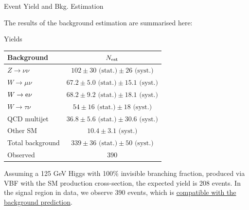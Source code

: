 \documentclass[8pt]{beamer}
\newcommand{\stat}{\text{ (stat.)}}
\newcommand{\syst}{\text{ (syst.)}}
\begin{document}
\begin{frame}{Event Yield and Bkg. Estimation}

The results of the background estimation are summarised here:

\begin{block}{Yields}

\begin{table}[th!]
\centering
\begin{tabular}{|l|c|}
\hline
Background 	 		& $N_{\rm est}$ \\
\hline
$Z \rightarrow \nu\nu$ 		& $102 \pm 30 \stat \pm 26 \syst$	\\
$W \rightarrow \mu\nu$ 	 	& $67.2 \pm 5.0 \stat \pm 15.1 \syst$ 	\\
$W \rightarrow {\rm e} \nu$  	& $68.2 \pm 9.2 \stat \pm 18.1 \syst$	\\
$W \rightarrow \tau \nu$ 	& $54 \pm 16 \stat \pm 18 \syst$ \\
QCD multijet 	 		& $36.8 \pm 5.6 \stat \pm 30.6 \syst$ \\
Other SM			& $10.4 \pm 3.1 \syst$ \\
\hline
Total background		& $339 \pm 36 \stat \pm 50 \syst$  \\
Observed 			& $390$  \\	
\hline
\end{tabular}
\end{table}

\end{block}

Assuming a 125 GeV Higgs with 100\% invisible branching fraction, produced via VBF with the SM production cross-section, the expected yield is 208 events. In the signal region in data, we observe 390 events, which is \uline{compatible with the background prediction}.

\end{frame}
\end{document}
